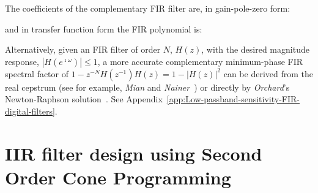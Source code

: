 \documentclass[a4paper,twoside,10pt,english]{report}
\begin{document}
The coefficients of the complementary FIR filter are, in gain-pole-zero form:
\begin{small}

\end{small}
and in transfer function form the FIR polynomial is:
\begin{small}

\end{small}
Alternatively, given an FIR filter of order $N$, $H\left(z\right)$, with
the desired magnitude response,
$\left|H\left(e^{\imath\omega}\right)\right| \le 1$, a more accurate complementary
minimum-phase FIR spectral factor of
$1-z^{-N}H\left(z^{-1}\right)H\left(z\right) = 1-\left|H\left(z\right)\right|^{2}$
can be derived from the real cepstrum
(see for example, \emph{Mian} and
\emph{Nainer}~\cite{MianNainer_FastDesignEquiRippleMinimumPhaseFIR}) or directly
by \emph{Orchard}'s Newton-Raphson
solution~\cite{OrchardWillson_ComputationMinimumPhaseSpectralFactor}. See
Appendix~\ref{app:Low-passband-sensitivity-FIR-digital-filters}.
\cleardoublepage
\chapter{\label{sec:IIR-Design-Using-SOCP}IIR filter design using Second Order Cone Programming}
\end{document}
